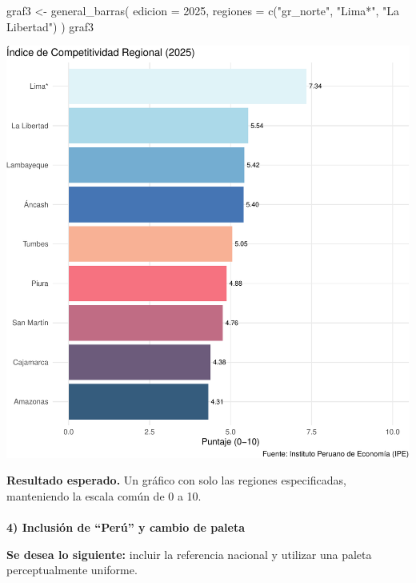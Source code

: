 \documentclass[
  11pt,
  letterpaper,
  DIV=11,
  numbers=noendperiod]{scrartcl}
\makeatletter
\let\oldparagraph\paragraph
\renewcommand{\paragraph}{
    \@ifstar
      \xxxParagraphStar
      \xxxParagraphNoStar
  }
\newcommand{\xxxParagraphStar}[1]{\oldparagraph*{#1}\mbox{}}
\newcommand{\xxxParagraphNoStar}[1]{\oldparagraph{#1}\mbox{}}
\newenvironment{Shaded}{\begin{snugshade}}{\end{snugshade}}
\newcommand{\AttributeTok}[1]{\textcolor[rgb]{0.40,0.45,0.13}{#1}}
\newcommand{\DecValTok}[1]{\textcolor[rgb]{0.68,0.00,0.00}{#1}}
\newcommand{\FunctionTok}[1]{\textcolor[rgb]{0.28,0.35,0.67}{#1}}
\newcommand{\NormalTok}[1]{\textcolor[rgb]{0.00,0.23,0.31}{#1}}
\newcommand{\OtherTok}[1]{\textcolor[rgb]{0.00,0.23,0.31}{#1}}
\newcommand{\StringTok}[1]{\textcolor[rgb]{0.13,0.47,0.30}{#1}}
\makeatother
\begin{document}
\begin{Shaded}
\begin{Highlighting}[]
\NormalTok{graf3 }\OtherTok{\textless{}{-}} \FunctionTok{general\_barras}\NormalTok{(}
  \AttributeTok{edicion =} \DecValTok{2025}\NormalTok{,}
  \AttributeTok{regiones =} \FunctionTok{c}\NormalTok{(}\StringTok{"gr\_norte"}\NormalTok{, }\StringTok{"Lima*"}\NormalTok{, }\StringTok{"La Libertad"}\NormalTok{)}
\NormalTok{)}
\NormalTok{graf3}
\end{Highlighting}
\end{Shaded}

\includegraphics{Manual_files/figure-pdf/unnamed-chunk-18-1.pdf}

\textbf{Resultado esperado.} Un gráfico con solo las regiones
especificadas, manteniendo la escala común de 0 a 10.

\paragraph{\texorpdfstring{\textbf{4) Inclusión de ``Perú'' y cambio de
paleta}}{4) Inclusión de ``Perú'' y cambio de paleta}}\label{inclusiuxf3n-de-peruxfa-y-cambio-de-paleta}

\textbf{Se desea lo siguiente:} incluir la referencia nacional y
utilizar una paleta perceptualmente uniforme.
\end{document}
